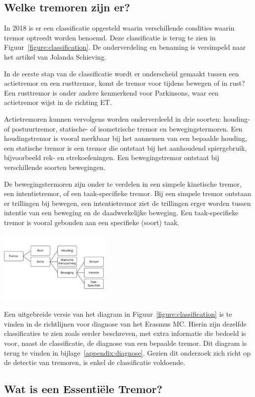 \subsection{Welke tremoren zijn er?}

In 2018 is er een classificatie opgesteld waarin verschillende condities waarin tremor optreedt worden benoemd\cite{knf2022}.
Deze classificatie is terug te zien in Figuur~\ref{figure:classification}.
De onderverdeling en benaming is versimpeld naar het artikel van Jolanda Schieving\cite{schieving2023}.

In de eerste stap van de classificatie wordt er onderscheid gemaakt tussen een actietremor en een rusttremor,
komt de tremor voor tijdens bewegen of in rust? Een rusttremor is onder andere kenmerkend voor Parkinsons,
waar een actietremor wijst in de richting ET\cite{elsevier2022}.

Actietremoren kunnen vervolgens worden onderverdeeld in drie soorten: houding- of postuurtremor,
statische- of isometrische tremor en bewegingstermoren.
Een houdingstremor is vooral merkbaar bij het aannemen van een bepaalde houding\cite{elsevier2022,erasmus2022}, 
een statische tremor is een tremor die ontstaat bij het aanhoudend spiergebruik, bijvoorbeeld rek- en strekoefeningen\cite{nowak2013, erasmus2022}.
Een bewegingstremor ontstaat bij verschillende soorten bewegingen\cite{elsevier2022}.

De bewegingstermoren zijn onder te verdelen in een simpele kinetische tremor, 
een intentietremor, of een taak-specifieke tremor. Bij een simpele tremor ontstaan er trillingen bij bewegen,
een intentietremor ziet de trillingen erger worden tussen intentie van een beweging en de daadwerkelijke beweging.
Een taak-specifieke tremor is vooral gebonden aan een specifieke (soort) taak\cite{erasmus2022}.

\begin{center}
    \includegraphics[width=0.4\textwidth]{./graphics/graph-tremor-classification.png}
    \label{figure:classification}
\end{center}

Een uitgebreide versie van het diagram in Figuur~\ref{figure:classification}
is te vinden in de richtlijnen voor diagnose van het Erasmus MC.
Hierin zijn dezelfde classificaties te zien zoals eerder beschreven, 
met extra informatie die bedoeld is voor, naast de classificatie, de diagnose van een bepaalde tremor\cite{erasmus2022}.
Dit diagram is terug te vinden in bijlage~\ref{appendix:diagnose}.
Gezien dit onderzoek zich richt op de detectie van tremoren, is enkel de classificatie voldoende.

\subsection{Wat is een Essentiële Tremor?}